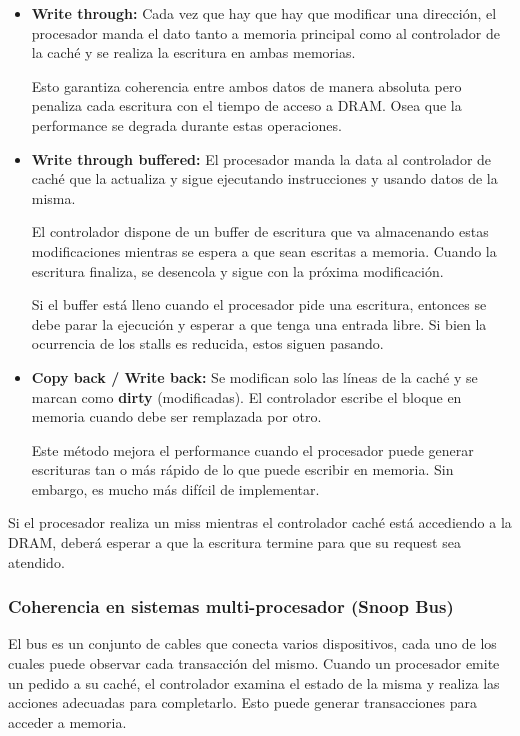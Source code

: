 \begin{itemize}
	\item \textbf{Write through:} Cada vez que hay que hay que modificar una dirección, el procesador manda el dato tanto a memoria principal como al controlador de la caché y se realiza la escritura en ambas memorias. 
	
	Esto garantiza coherencia entre ambos datos de manera absoluta pero penaliza cada escritura con el tiempo de acceso a DRAM. Osea que la performance se degrada durante estas operaciones.
	
	\item \textbf{Write through buffered:} El procesador manda la data al controlador de caché que la actualiza y sigue ejecutando instrucciones y usando datos de la misma.
	
	El controlador dispone de un buffer de escritura que va almacenando estas modificaciones mientras se espera a que sean escritas a memoria. Cuando la escritura finaliza, se desencola y sigue con la próxima modificación.
	
 	Si el buffer está lleno cuando el procesador pide una escritura, entonces se debe parar la ejecución y esperar a que tenga una entrada libre. Si bien la ocurrencia de los stalls es reducida, estos siguen pasando.
 	
 	\item \textbf{Copy back / Write back:} Se modifican solo las líneas de la caché y se marcan como \textbf{dirty} (modificadas). El controlador escribe el bloque en memoria cuando debe ser remplazada por otro. 
 	
 	Este método mejora el performance cuando el procesador puede generar escrituras tan o más rápido de lo que puede escribir en memoria. Sin embargo, es mucho más difícil de implementar.
\end{itemize}

Si el procesador realiza un miss mientras el controlador caché está accediendo a la DRAM, deberá esperar a que la escritura termine para que su request sea atendido.

\subsubsection{Coherencia en sistemas multi-procesador (Snoop Bus)}


El bus es un conjunto de cables que conecta varios dispositivos, cada uno de los cuales puede observar cada transacción del mismo. Cuando un procesador emite un pedido a su caché, el controlador examina el estado de la misma y realiza las acciones adecuadas para completarlo. Esto puede generar transacciones para acceder a memoria.

